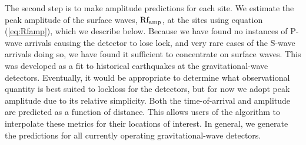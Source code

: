 \documentclass[twocolumn, aps, superscriptaddress]{revtex4}
\begin{document}
The second step is to make amplitude predictions for each site. We estimate the peak amplitude of the surface waves, $\rm Rf_{amp}$, at the sites using equation (\ref{eq:Rfamp}), which we describe below. Because we have found no instances of P-wave arrivals causing the detector to lose lock, and very rare cases of the S-wave arrivals doing so, we have found it sufficient to concentrate on surface waves. This was developed as a fit to historical earthquakes at the gravitational-wave detectors. %
Eventually, it would be appropriate to determine what observational quantity is best suited to lockloss for the detectors, but for now we adopt peak amplitude due to its relative simplicity. Both the time-of-arrival and amplitude are predicted as a function of distance. This allows users of the algorithm to interpolate these metrics for their locations of interest. In general, we generate the predictions for all currently operating gravitational-wave detectors.
\end{document}
